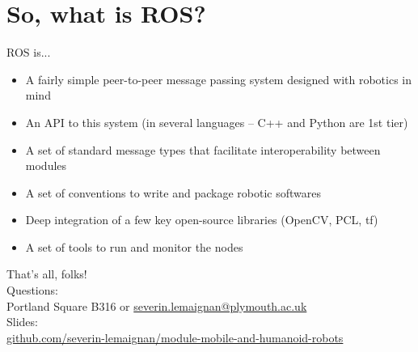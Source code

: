 \documentclass[compress]{beamer}
\begin{document}
\section[So?]{So, what is ROS?}

\begin{frame}{ROS is...}
    \begin{itemize}
        \item<+-> A fairly simple peer-to-peer message passing system designed with robotics in
            mind
        \item<+-> An API to this system (in several languages -- C++ and Python are
            1st tier)
        \item<+-> A set of standard message types that facilitate interoperability between modules
        \item<+-> A set of conventions to write and package robotic softwares
        \item<+-> Deep integration of a few key open-source libraries (OpenCV, PCL, tf)
        \item<+-> A set of tools to run and monitor the nodes
    \end{itemize}
\end{frame}


\begin{frame}{}
    \begin{center}
        \Large
        That's all, folks!\\[2em]
        \normalsize
        Questions:\\
        Portland Square B316 or \url{severin.lemaignan@plymouth.ac.uk} \\[1em]

        Slides:\\ 
        \href{https://github.com/severin-lemaignan/module-mobile-and-humanoid-robots}{\small github.com/severin-lemaignan/module-mobile-and-humanoid-robots}


    \end{center}
\end{frame}
\end{document}

